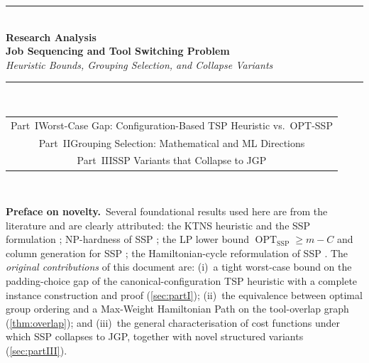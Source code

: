 \documentclass[11pt,a4paper]{article}
\theoremstyle{plain}
\theoremstyle{definition}
\DeclareMathOperator{\OPT}{OPT}
\begin{document}

\begin{titlepage}
\centering\vspace*{2cm}
{\color{navyblue}\rule{\textwidth}{2pt}}\\[0.5cm]
{\Huge\bfseries\color{navyblue}Research Analysis}\\[0.4cm]
{\LARGE\bfseries\color{navyblue}Job Sequencing and Tool Switching Problem}\\[0.3cm]
{\Large\itshape\color{midblue}Heuristic Bounds, Grouping Selection, and Collapse Variants}\\[0.3cm]
{\color{navyblue}\rule{\textwidth}{2pt}}\\[1.5cm]
{\normalsize\begin{tabular}{c}
Part~I\quad Worst-Case Gap: Configuration-Based TSP Heuristic vs.\ OPT-SSP\\[2pt]
Part~II\quad Grouping Selection: Mathematical and ML Directions\\[2pt]
Part~III\quad SSP Variants that Collapse to JGP
\end{tabular}}\\[2cm]
\begin{mdframed}[backgroundcolor=lightblue,linecolor=navyblue,linewidth=1pt,
  innerleftmargin=18pt,innerrightmargin=18pt,innertopmargin=12pt,innerbottommargin=12pt]
\small
\textbf{Preface on novelty.}\ Several foundational results used here are from the
literature and are clearly attributed: the KTNS heuristic and the SSP formulation
\cite{TangDenardo1988}; NP-hardness of SSP \cite{Crama1994}; the LP lower bound
$\OPT_{\mathrm{SSP}} \ge m-C$ and column generation for SSP \cite{daSilva2021};
the Hamiltonian-cycle reformulation of SSP \cite{Ghiani2007}.
The \emph{original contributions} of this document are:
(i)~a tight worst-case bound on the padding-choice gap of the canonical-configuration
TSP heuristic with a complete instance construction and proof
(\cref{sec:partI});
(ii)~the equivalence between optimal group ordering and a Max-Weight Hamiltonian Path
on the tool-overlap graph (\cref{thm:overlap}); and
(iii)~the general characterisation of cost functions under which SSP collapses to JGP,
together with novel structured variants (\cref{sec:partIII}).
\end{mdframed}
\vfill
\end{titlepage}

\tableofcontents\newpage

\end{document}
